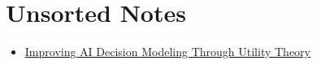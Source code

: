 \chapter{Unsorted Notes}

\begin{itemize}
	\item \href{https://www.gdcvault.com/play/1012410/Improving-AI-Decision-Modeling-Through}{Improving AI Decision Modeling Through Utility Theory}
\end{itemize}